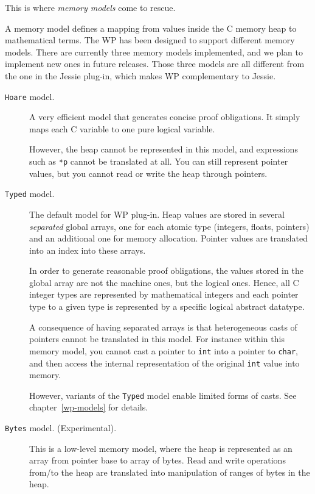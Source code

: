 This is where \emph{memory models} come to rescue.

A memory model defines a mapping from values inside the \textsf{C} memory
heap to mathematical terms. The \textsf{WP} has been designed to support
different memory models. There are currently three memory models
implemented, and we plan to implement new ones in future releases.
Those three models are all different from the one in the \textsf{Jessie}
plug-in, which makes \textsf{WP} complementary to \textsf{Jessie}.

\begin{description}

\item[\texttt{Hoare} model.]  A very efficient model that generates
  concise proof obligations. It simply maps each \textsf{C} variable to one
  pure logical variable.\par

  However, the heap cannot be represented in this model, and
  expressions such as \texttt{*p} cannot be translated at all. You
  can still represent pointer values, but you cannot read or write
  the heap through pointers.

\item[\texttt{Typed} model.] The default model for \textsf{WP}
  plug-in. Heap values are stored in several \emph{separated} global
  arrays, one for each atomic type (integers, floats, pointers) and
  an additional one for memory allocation. Pointer values are translated
  into an index into these arrays.\par

  In order to generate reasonable proof obligations, the values stored
  in the global array are not the machine ones, but the logical
  ones. Hence, all \textsf{C} integer types are represented by
  mathematical integers and each pointer type to a given type is represented
  by a specific logical abstract datatype.\par

  A consequence of having separated arrays is that heterogeneous casts
  of pointers cannot be translated in this model. For instance within
  this memory model, you cannot cast a pointer to \texttt{int} into a
  pointer to \texttt{char}, and then access the internal
  representation of the original \texttt{int} value into memory.

  However, variants of the \texttt{Typed} model enable limited forms of casts.
  See chapter~\ref{wp-models} for details.

\item[\texttt{Bytes} model. (Experimental).] This is a low-level memory model,
  where the heap is represented as an array from pointer base to array of bytes.
  Read and write operations from/to the heap are translated  into manipulation
  of ranges of bytes in the heap.\par


\end{description}

